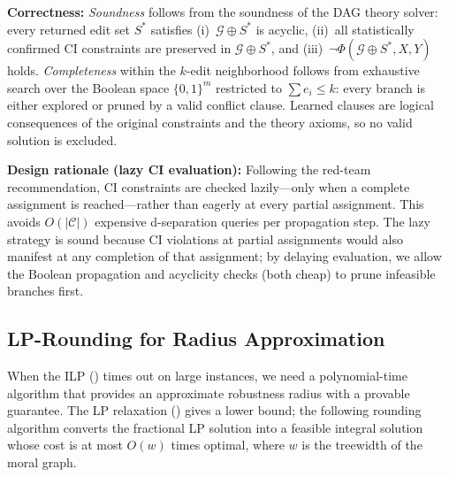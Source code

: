 \documentclass[11pt,a4paper]{article}
\theoremstyle{definition}
\theoremstyle{remark}
\newcommand{\DAG}{\mathcal{G}}
\newcommand{\Phi}{\varPhi}
\begin{document}
\smallskip
\noindent\textbf{Correctness:} \emph{Soundness} follows from the soundness of the DAG
theory solver: every returned edit set $S^*$ satisfies (i)~$\DAG \oplus S^*$ is acyclic,
(ii)~all statistically confirmed CI constraints are preserved in $\DAG \oplus S^*$, and
(iii)~$\neg\Phi(\DAG \oplus S^*, X, Y)$ holds. \emph{Completeness} within the $k$-edit
neighborhood follows from exhaustive search over the Boolean space $\{0,1\}^m$ restricted
to $\sum e_i \leq k$: every branch is either explored or pruned by a valid conflict
clause. Learned clauses are logical consequences of the original constraints and the
theory axioms, so no valid solution is excluded.

\smallskip
\noindent\textbf{Design rationale (lazy CI evaluation):} Following the red-team
recommendation, CI constraints are checked lazily---only when a complete assignment is
reached---rather than eagerly at every partial assignment. This avoids
$O(|\mathcal{C}|)$ expensive d-separation queries per propagation step. The lazy strategy
is sound because CI violations at partial assignments would also manifest at any
completion of that assignment; by delaying evaluation, we allow the Boolean propagation
and acyclicity checks (both cheap) to prune infeasible branches first.


\subsection{LP-Rounding for Radius Approximation}\label{sec:lp_rounding}

When the ILP () times out on large instances, we need a polynomial-time
algorithm that provides an approximate robustness radius with a provable guarantee. The
LP relaxation () gives a lower bound; the following rounding algorithm
converts the fractional LP solution into a feasible integral solution whose cost is at
most $O(w)$ times optimal, where $w$ is the treewidth of the moral graph.
\end{document}
